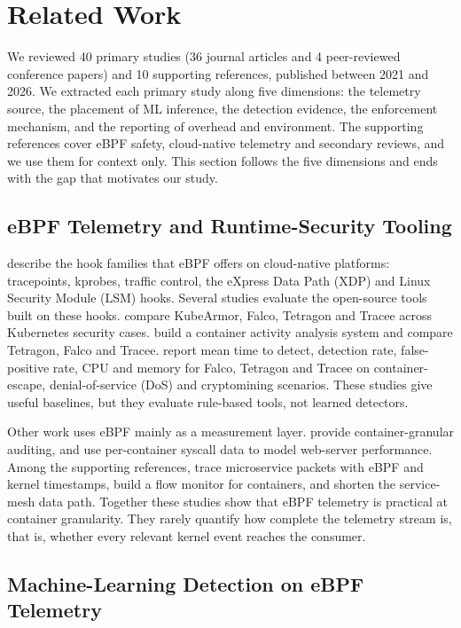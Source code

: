 \section{Related Work}
\label{sec:related}

We reviewed 40 primary studies (36 journal articles and 4 peer-reviewed conference papers) and 10 supporting references, published between 2021 and 2026. We extracted each primary study along five dimensions: the telemetry source, the placement of ML inference, the detection evidence, the enforcement mechanism, and the reporting of overhead and environment. The supporting references cover eBPF safety, cloud-native telemetry and secondary reviews, and we use them for context only. This section follows the five dimensions and ends with the gap that motivates our study.

\subsection{eBPF Telemetry and Runtime-Security Tooling}

\textcite{P007} describe the hook families that eBPF offers on cloud-native platforms: tracepoints, kprobes, traffic control, the eXpress Data Path (XDP) and Linux Security Module (LSM) hooks. Several studies evaluate the open-source tools built on these hooks. \textcite{P001} compare KubeArmor, Falco, Tetragon and Tracee across Kubernetes security cases. \textcite{P022} build a container activity analysis system and compare Tetragon, Falco and Tracee. \textcite{P040} report mean time to detect, detection rate, false-positive rate, CPU and memory for Falco, Tetragon and Tracee on container-escape, denial-of-service (DoS) and cryptomining scenarios. These studies give useful baselines, but they evaluate rule-based tools, not learned detectors.

Other work uses eBPF mainly as a measurement layer. \textcite{P037} provide container-granular auditing, and \textcite{P021} use per-container syscall data to model web-server performance. Among the supporting references, \textcite{R044} trace microservice packets with eBPF and kernel timestamps, \textcite{R045} build a flow monitor for containers, and \textcite{R046} shorten the service-mesh data path. Together these studies show that eBPF telemetry is practical at container granularity. They rarely quantify how complete the telemetry stream is, that is, whether every relevant kernel event reaches the consumer.

\subsection{Machine-Learning Detection on eBPF Telemetry}

